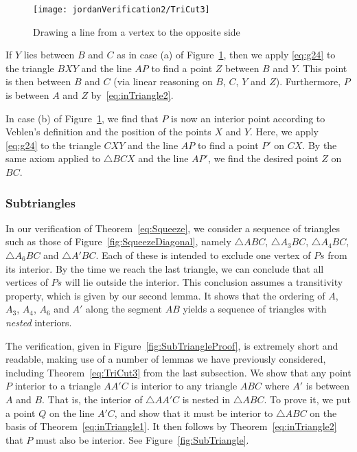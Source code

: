 \begin{figure}
\centering\texttt{[image: jordanVerification2/TriCut3]}
\caption{Drawing a line from a vertex to the opposite side}
\label{fig:TriCut3}
\end{figure}

If $Y$ lies between $B$ and $C$ as in case (a) of Figure~\ref{fig:TriCut3}, then we apply \eqref{eq:g24} to the triangle $BXY$ and the line $AP$ to find a point $Z$ between $B$ and $Y$. This point is then between $B$ and $C$ (via linear reasoning on $B$, $C$, $Y$ and $Z$). Furthermore, $P$ is between $A$ and $Z$ by~\eqref{eq:inTriangle2}.

In case (b) of Figure~\ref{fig:TriCut3}, we find that $P$ is now an interior point according to Veblen's definition and the position of the points $X$ and $Y$. Here, we apply \eqref{eq:g24} to the triangle $CXY$ and the line $AP$ to find a point $P'$ on $CX$. By the same axiom applied to $\triangle BCX$ and the line $AP'$, we find the desired point $Z$ on $BC$.

\subsubsection{Subtriangles}\label{sec:Subtriangles}
In our verification of Theorem~\ref{eq:Squeeze}, we consider a sequence of triangles such as those of Figure~\ref{fig:SqueezeDiagonal}, namely $\triangle ABC$, $\triangle A_3BC$, $\triangle A_4BC$, $\triangle A_6BC$ and $\triangle A'BC$. Each of these is intended to exclude one vertex of $Ps$ from its interior. By the time we reach the last triangle, we can conclude that all vertices of $Ps$ will lie outside the interior. This conclusion assumes a transitivity property, which is given by our second lemma. It shows that the ordering of $A$, $A_3$, $A_4$, $A_6$ and $A'$ along the segment $AB$ yields a sequence of triangles with \emph{nested} interiors. 

The verification, given in Figure~\ref{fig:SubTriangleProof}, is extremely short and readable, making use of a number of lemmas we have previously considered, including Theorem~\ref{eq:TriCut3} from the last subsection. We show that any point $P$ interior to a triangle $AA'C$ is interior to any triangle $ABC$ where $A'$ is between $A$ and $B$. That is, the interior of $\triangle AA'C$ is nested in $\triangle ABC$. To prove it, we put a point $Q$ on the line $A'C$, and show that it must be interior to $\triangle ABC$ on the basis of Theorem~\ref{eq:inTriangle1}. It then follows by Theorem~\ref{eq:inTriangle2} that $P$ must also be interior. See Figure~\ref{fig:SubTriangle}.


